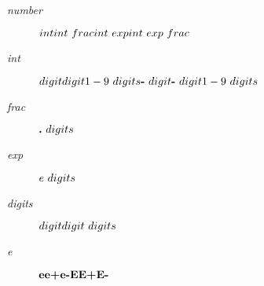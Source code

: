 \begin{description}
	\item[\textit{number}] {
		$
			\\
			int\\
			int\ frac\\
			int\ exp\\
			int\ exp\ frac
		$
	}
	
	\item[\textit{int}] {
		$
			\\
			digit\\
			digit1-9\ digits\\
			\textbf{-}\ digit\\
			\textbf{-}\ digit1-9\ digits
		$
	}
	
	\item[\textit{frac}] {
		$
			\\
			\textbf{.}\ digits
		$
	}

	\item[\textit{exp}] {
		$
			\\
			e\ digits
		$
	}
	
	\item[\textit{digits}] {
		$
			\\
			digit\\
			digit\ digits
		$
	}

	\item[\textit{e}] {
		$
			\\
			\textbf{e}\\
			\textbf{e+}\\
			\textbf{e-}\\
			\textbf{E}\\
			\textbf{E+}\\
			\textbf{E-}
		$
	}	




\end{description}